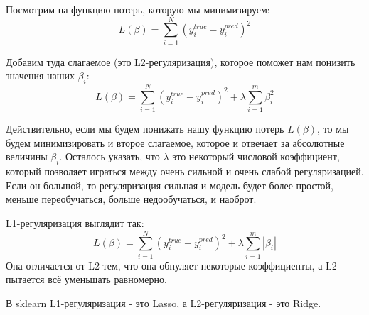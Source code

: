 Посмотрим на функцию потерь, которую мы минимизируем:
$$L(\beta)=\sum_{i=1}^{N}(y^{true}_i-y^{pred}_i)^2$$

Добавим туда слагаемое (это L2-регуляризация), которое поможет нам понизить значения наших $\beta_i$:
$$L(\beta)=\sum_{i=1}^{N}(y^{true}_i-y^{pred}_i)^2 + \lambda \sum_{i=1}^m\beta_i^2$$

Действительно, если мы будем понижать нашу функцию потерь $L(\beta)$, то мы будем минимизировать и второе слагаемое, которое и отвечает за абсолютные величины $\beta_i$. Осталось указать, что $\lambda$ это некоторый числовой коэффициент, который позволяет играться между очень сильной и очень слабой регуляризацией. Если он большой, то регуляризация сильная и модель будет более простой, меньше переобучаться, больше недообучаться, и наоброт. 

L1-регуляризация выглядит так:
$$L(\beta)=\sum_{i=1}^{N}(y^{true}_i-y^{pred}_i)^2 + \lambda \sum_{i=1}^m|\beta_i|$$
Она отличается от L2 тем, что она обнуляет некоторые коэффициенты, а L2 пытается всё уменьшать равномерно.

В sklearn L1-регуляризация - это Lasso, а L2-регуляризация - это Ridge.
